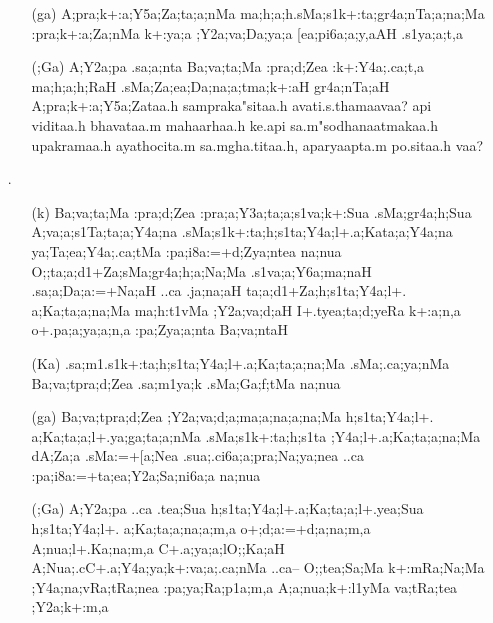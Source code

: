 \begin{itemize}
\begin{itemize}
          \item[({\sktf ga})] {\sktf A;pra;k+:a;Y5a;Za;ta;a;nMa
ma;h;a;h}{\sktf .sMa;s1k+:ta;gr4a;nTa;a;na;Ma
:pra;k+:a;Za;nMa k+:ya;a ;Y2a;va;Da;ya;a [ea;pi6a;a;y,aAH .s1ya;a;t,a }
          
          \item[({\sktf ;Ga})] {\sktf A;Y2a;pa .sa;a;nta
Ba;va;ta;Ma :pra;d;Zea :k+:Y4a;.ca;t,a ma;h;a;h;RaH
.sMa;Za;ea;Da;na;a;tma;k+:aH gr4a;nTa;aH A;pra;k+:a;Y5a;Za}{\sktf taa.h sampraka"sitaa.h avati.s.thamaavaa? api viditaa.h bhavataa.m mahaarhaa.h ke.api sa.m"sodhanaatmakaa.h upakramaa.h ayathocita.m sa.mgha.titaa.h, aparyaapta.m po.sitaa.h vaa?}
          \end{itemize}

\item[{\sktf 25}.] \begin{itemize}
               
               \item[({\sktf k})] {\sktf Ba;va;ta;Ma :pra;d;Zea
:pra;a;Y3a;ta;a;s1va;k+:Sua
.sMa;gr4a;h;Sua A;va;a;s1Ta;ta;a;Y4a;na} {\sktf
.sMa;s1k+:ta;h;s1ta\ZF{-};Y4a;l+.a;Kata;a;Y4a;na ya;Ta;ea;Y4a;.ca;tMa :pa;i8a:=+d;Zya;ntea
na;nua O;;ta;a;d1+Za;sMa;gr4a;h;a;Na;Ma .s1va;a;Y6a;ma;naH
.sa;a;Da;a:=+Na;aH ..ca .ja;na;aH ta;a;d1+Za;h;s1ta;Y4a;l+.%
a;Ka;ta;a;na;Ma ma;h:t1vMa ;Y2a;va;d;aH\ZF{,}
I+.tyea;ta;d;yeRa k+:a;n,a o+.pa;a;ya;a;n,a :pa;Zya;a;nta
Ba;va;ntaH}
               
               \item[({\sktf Ka})] {\sktf .sa;m1.s1k+:ta;h;s1ta;Y4a;l+.a;Ka;ta;a;na;Ma .sMa;.ca;ya;nMa
Ba;va;tpra;d;Zea .sa;m1ya;k .sMa;Ga;f;tMa na;nua }
               
               \item[({\sktf ga})] {\sktf Ba;va;tpra;d;Zea
;Y2a;va;d;a;ma;a;na;a;na;Ma h;s1ta;Y4a;l+.%
a;Ka;ta;a;l+.ya;ga;ta;a;nMa .sMa;s1k+:ta;h;s1ta%
\ZF{-};Y4a;l+.a;Ka;ta;a;na;Ma dA;Za;a .sMa:=+[a;Nea .sua;.ci6a;a;pra;Na;ya;nea ..ca
:pa;i8a:=+ta;ea;Y2a;Sa;ni6a;a na;nua } 
               
               \item[({\sktf ;Ga})] {\sktf A;Y2a;pa ..ca .tea;Sua
h;s1ta;Y4a;l+.a;Ka;ta;a;l+.yea;Sua h;s1ta;Y4a;l+.%
a;Ka;ta;a;na;a;m,a o+;d;a:=+d;a;na;m,a\ZF{,}
A;nua;l+.Ka;na;m,a\ZF{,} C+.a;ya;a;lO;;Ka;aH\ZF{,} A;Nua;.cC+.a;Y4a;ya;k+:va;a;.ca;nMa ..ca}{\rm--}{\sktf
O;;tea;Sa;Ma k+:mRa;Na;Ma ;Y4a;na;vRa;tRa;nea :pa;ya;Ra;p1a;m,a
A;a;nua;k+:l1yMa va;tRa;tea ;Y2a;k+:m,a }
               \end{itemize}


\end{itemize}
